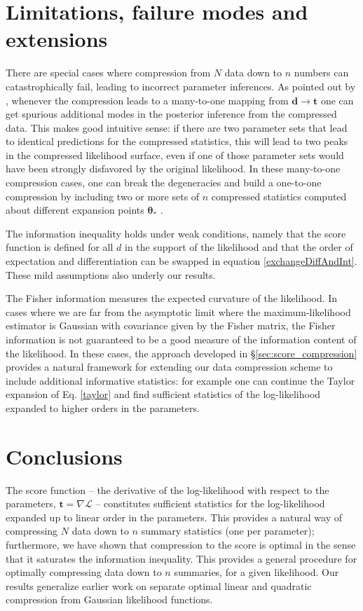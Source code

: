 \documentclass[fleqn,usenatbib]{mnras}
\def\btheta{\boldsymbol{\theta}}
\def\data{\mathbf{d}}
\def\bdtwidle{\mathbf{t}}
\def\L{\mathcal{L}}
\begin{document}
\section{Limitations, failure modes and extensions}
\label{sec:failure_modes}
%
There are special cases where compression from $N$ data down to $n$ numbers can catastrophically fail, leading to incorrect parameter inferences. As pointed out by \citet{Graff2011}, whenever the compression leads to a many-to-one mapping from $\data\rightarrow\bdtwidle$ one can get spurious additional modes in the posterior inference from the compressed data. This makes good intuitive sense: if there are two parameter sets that lead to identical predictions for the compressed statistics, this will lead to two peaks in the compressed likelihood surface, even if one of those parameter sets would have been strongly disfavored by the original likelihood. In these many-to-one compression cases, one can break the degeneracies and build a one-to-one compression by including two or more sets of $n$ compressed statistics computed about different expansion points $\btheta_*$ \citep{Protopapas2005}. 

The information inequality holds under weak conditions, namely that the score function is defined for all $d$ in the support of the likelihood and that the order of expectation and differentiation can be swapped in equation \eqref{exchangeDiffAndInt}. These mild assumptions also underly our results. 

The Fisher information measures the expected curvature of the likelihood. In cases where we are far from the asymptotic limit where the maximum-likelihood estimator is Gaussian with covariance given by the Fisher matrix, the Fisher information is not guaranteed to be a good measure of the information content of the likelihood. In these cases, the approach developed in \S \ref{sec:score_compression} provides a natural framework for extending our data compression scheme to include additional informative statistics: for example one can  continue the Taylor expansion of Eq. \eqref{taylor} and find sufficient statistics of the log-likelihood expanded to higher orders in the parameters.
%
\section{Conclusions}
\label{sec:conclusions}
%
The score function -- the derivative of the log-likelihood with respect to the parameters, $\mathbf{t}=\nabla\L$ -- constitutes sufficient statistics for the log-likelihood expanded up to linear order in the parameters. This provides a natural way of compressing $N$ data down to $n$ summary statistics (one per parameter); furthermore, we have shown that compression to the score is optimal in the sense that it saturates the information inequality. This provides a general procedure for optimally compressing data down to $n$ summaries, for a given likelihood. Our results generalize earlier work on separate optimal linear and quadratic compression from Gaussian likelihood functions.
\end{document}
